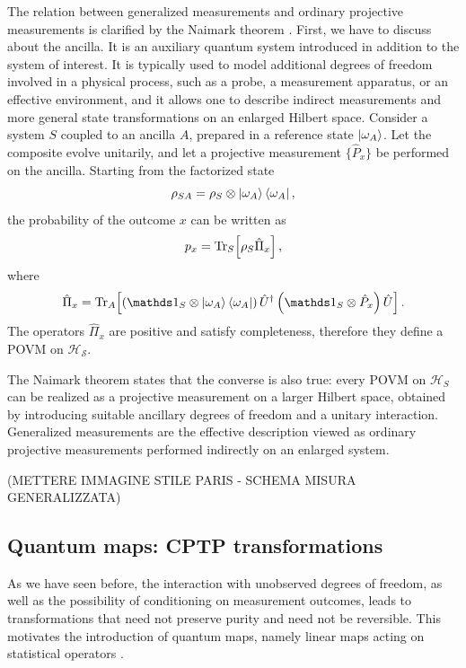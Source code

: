 The relation between generalized measurements and ordinary projective measurements is clarified by the Naimark theorem \cite{ParisTools12}. First, we have to discuss about the ancilla. It is an auxiliary quantum system introduced in addition to the system of interest. It is typically used to model additional degrees of freedom involved in a physical process, such as a probe, a measurement apparatus, or an effective environment, and it allows one to describe indirect measurements and more general state transformations on an enlarged Hilbert space. Consider a system \(S\) coupled to an ancilla \(A\), prepared in a reference state \(\ket{\omega_A}\). Let the composite evolve unitarily, and let a projective measurement \(\{\hat P_x\}\) be performed on the ancilla. Starting from the factorized state
\begin{equation}
	\rho_{SA}=\rho_S \otimes \ket{\omega_A}\bra{\omega_A},
	\label{eq:open_qs_naimark_factorized_state}
\end{equation}
the probability of the outcome \(x\) can be written as
\begin{equation}
	p_x=\Tr_S\!\left[\rho_S \hat \Pi_x\right],
	\label{eq:open_qs_indirect_measurement_probability_reduced}
\end{equation}
where
\begin{equation}
	\hat \Pi_x
	=
	\Tr_A\!\left[
	\left(
	\id_S \otimes \ket{\omega_A}\bra{\omega_A}
	\right)
	\hat U^\dagger
	\left(
	\id_S \otimes \hat P_x
	\right)
	\hat U
	\right].
	\label{eq:open_qs_indirect_measurement_povm}
\end{equation}
The operators \(\hat \Pi_x\) are positive and satisfy completeness, therefore they define a POVM on $\mathcal{H_S}$.

The Naimark theorem states that the converse is also true: every POVM on \(\mathcal{H}_S\) can be realized as a projective measurement on a larger Hilbert space, obtained by introducing suitable ancillary degrees of freedom and a unitary interaction. Generalized measurements are the effective description viewed as ordinary projective measurements performed indirectly on an enlarged system.

(METTERE IMMAGINE STILE PARIS - SCHEMA MISURA GENERALIZZATA)


\subsection{Quantum maps: CPTP transformations}
\label{subsec:quantum_maps_and_completely_positive_transformations}
As we have seen before, the interaction with unobserved degrees of freedom, as well as the possibility of conditioning on measurement outcomes, leads to transformations that need not preserve purity and need not be reversible. This motivates the introduction of quantum maps, namely linear maps acting on statistical operators \cite{Vac24}.

